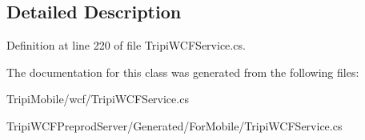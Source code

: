 \subsection{Detailed Description}


Definition at line 220 of file TripiWCFService.cs.

The documentation for this class was generated from the following files:\begin{DoxyCompactItemize}
\item 
TripiMobile/wcf/TripiWCFService.cs\item 
TripiWCFPreprodServer/Generated/ForMobile/TripiWCFService.cs\end{DoxyCompactItemize}
